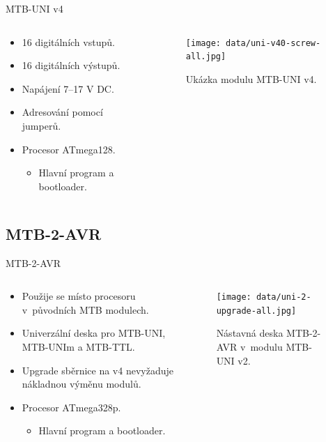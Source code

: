 \documentclass[aspectratio=169]{beamer}
\begin{document}
\begin{frame}{MTB-UNI v4}
\begin{columns}
	\begin{column}{.5\textwidth}
		\begin{itemize}
		\item 16 digitálních vstupů.
		\item 16 digitálních výstupů.
		\item Napájení 7–17 V DC.
		\item Adresování pomocí jumperů.
		\item Procesor ATmega128.
		\begin{itemize}
			\item Hlavní program a bootloader.
		\end{itemize}
		\end{itemize}
	\end{column}
	\begin{column}{.5\textwidth}
		\begin{figure}
		\texttt{[image: data/uni-v40-screw-all.jpg]}
		\caption{Ukázka modulu MTB-UNI v4.}
		\end{figure}
	\end{column}
\end{columns}
\end{frame}


\subsection{MTB-2-AVR}

\begin{frame}{MTB-2-AVR}
\begin{columns}
	\begin{column}{.5\textwidth}
		\begin{itemize}
		\item Použije se místo procesoru v původních MTB modulech.
		\item Univerzální deska pro MTB-UNI, MTB-UNIm a MTB-TTL.
		\item Upgrade sběrnice na v4 nevyžaduje nákladnou výměnu modulů.
		\item Procesor ATmega328p.
		\begin{itemize}
			\item Hlavní program a bootloader.
		\end{itemize}
		\end{itemize}
	\end{column}
	\begin{column}{.5\textwidth}
		\begin{figure}
		\texttt{[image: data/uni-2-upgrade-all.jpg]}
		\caption{Nástavná deska MTB-2-AVR v modulu MTB-UNI v2.}
		\end{figure}
	\end{column}
\end{columns}
\end{frame}
\end{document}
